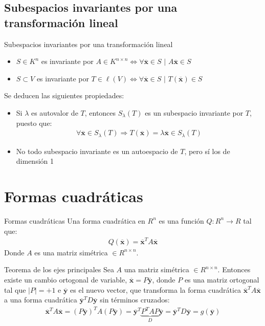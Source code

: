 \documentclass[a4paper, twoside]{article}
\numberwithin{equation}{section}
\numberwithin{figure}{section}
\numberwithin{table}{section}
\newcommand{\vect}[1]{\overline{\textbf{#1}}}
\newcommand{\dete}[1]{\left\vert #1 \right\vert}
\begin{document}
\subsection{Subespacios invariantes por una transformación lineal}
\begin{definicion*}{Subespacios invariantes por una transformación lineal}
	\begin{itemize}
		\item $S \in K^n$ es invariante por $A \in K^{n \times n} \Longleftrightarrow \forall \vect{x} \in S$ $\vert$ $A\vect{x} \in S$
		\item $S \subset V$ es invariante por $T \in \ell (V) \Longleftrightarrow \forall \vect{x} \in S$ $\vert$ $T(\vect{x}) \in S$
	\end{itemize}
	Se deducen las siguientes propiedades:
	\begin{itemize}
		\item Si $\lambda$ es autovalor de $T$, entonces $S_\lambda(T)$ es un subespacio invariante por $T$, puesto que:
		\begin{align}
			\forall \vect{x} \in S_\lambda(T) \Rightarrow T(\vect{x})=\lambda \vect{x} \in S_\lambda(T)
		\end{align}
		\item No todo subespacio invariante es un autoespacio de $T$, pero sí los de dimensión 1
	\end{itemize}
\end{definicion*}

\newpage
\section{Formas cuadráticas}
\begin{definicion*}{Formas cuadráticas}
	Una forma cuadrática en $R^n$ es una función $Q:R^n \to R$ tal que:
	\begin{align}
		Q(\vect{x})=\vect{x}^TA\vect{x}
	\end{align}
	Donde $A$ es una matriz simétrica $\in R^{n \times n}$.
\end{definicion*}

\begin{teorema*}{Teorema de los ejes principales}
	Sea $A$ una matriz simétrica $\in R^{n \times n}$. Entonces existe un cambio ortogonal de variable, $\vect{x} = P\vect{y}$, donde $P$ es una matriz ortogonal tal que $\dete{P}=+1$ e $\vect{y}$ es el nuevo vector, que transforma la forma cuadrática $\vect{x}^TA\vect{x}$ a una forma cuadrática $\vect{y}^T D \vect{y}$ sin términos cruzados:
	\begin{align}
		\vect{x}^T A \vect{x}=\left(P\vect{y}\right)^T A \left(P\vect{y}\right)=\vect{y}^T \underbrace{P^T A P}_{D} \vect{y}=\vect{y}^T D \vect{y}=g(\vect{y})
	\end{align}
\end{teorema*}
\end{document}
